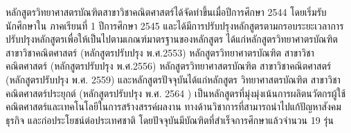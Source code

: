 หลักสูตรวิทยาศาสตรบัณฑิตสาขาวิชาคณิตศาสตร์ได้จัดทำขึ้นเมื่อปีการศึกษา 2544 โดยเริ่มรับนักศึกษาใน ภาคเรียนที่ 1 ปีการศึกษา 2545  และได้มีการปรับปรุงหลักสูตรตามกรอบระยะเวลาการปรับปรุงหลักสูตรเพื่อให้เป็นไปตามเกณฑ์มาตรฐานของหลักสูตร ได้แก่หลักสูตรวิทยาศาตรบัณฑิต สาขาวิชาคณิตศาสตร์ (หลักสูตรปรับปรุง พ.ศ.2553) หลักสูตรวิทยาศาตรบัณฑิต สาขาวิชาคณิตศาสตร์ (หลักสูตรปรับปรุง พ.ศ.2556) หลักสูตรวิทยาศาสตรบัณฑิต สาขาวิชาคณิตศาสตร์ (หลักสูตรปรับปรุง พ.ศ. 2559) และหลักสูตรปัจจุบันได้แก่หลักสูตร วิทยาศาสตรบัณฑิต สาขาวิชาคณิตศาสตร์ประยุกต์ (หลักสูตรปรับปรุง พ.ศ. 2564 ) เป็นหลักสูตรที่มุ่งมุ่งเน้นการผลิตนวัตกรผู้ใช้คณิตศาสตร์และเทคโนโลยีในการสร้างสรรค์ผลงาน ทางด้านวิชาการที่สามารถนำไปแก้ปัญหาสังคม ธุรกิจ และก่อประโยชน์ต่อประเทศชาติ โดยปัจจุบันมีบัณฑิตที่สำเร็จการศึกษาแล้วจำนวน 19 รุ่น


